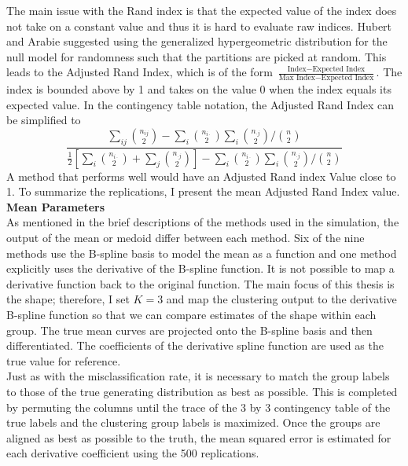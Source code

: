The main issue with the Rand index is that the expected value of the index does not take on a constant value and thus it is hard to evaluate raw indices. Hubert and Arabie suggested using the generalized hypergeometric distribution for the null model for randomness such that the partitions are picked at random. This leads to the Adjusted Rand Index, which is of the form $\frac{\text{Index} - \text{Expected Index}}{\text{Max Index}-\text{Expected Index}}$. The index is bounded above by 1 and takes on the value 0 when the index equals its expected value. In the contingency table notation, the Adjusted Rand Index can be simplified to
$$\frac{\sum_{ij}{n_{ij} \choose 2} - \sum_{i} {n_{i\cdot} \choose 2} \sum_{i} {n_{\cdot j} \choose 2} / {n \choose 2}}{\frac{1}{2}\left[\sum_{i}{n_{i\cdot} \choose 2}+\sum_{j}{n_{\cdot j} \choose 2}\right] - \sum_{i} {n_{i\cdot} \choose 2} \sum_{i} {n_{\cdot j} \choose 2} / {n \choose 2}}$$
A method that performs well would have an Adjusted Rand index Value close to 1. To summarize the replications, I present the mean Adjusted Rand Index value.\\

\textbf{Mean Parameters}\\
As mentioned in the brief descriptions of the methods used in the simulation, the output of the mean or medoid differ between each method. Six of the nine methods use the B-spline basis to model the mean as a function and one method explicitly uses the derivative of the B-spline function. It is not possible to map a derivative function back to the original function. The main focus of this thesis is the shape; therefore, I set $K=3$ and map the clustering output to the derivative B-spline function so that we can compare estimates of the shape within each group. The true mean curves are projected onto the B-spline basis and then differentiated. The coefficients of the derivative spline function are used as the true value for reference. \\

Just as with the misclassification rate, it is necessary to match the group labels to those of the true generating distribution as best as possible. This is completed by permuting the columns until the trace of the 3 by 3 contingency table of the true labels and the clustering group labels is maximized. Once the groups are aligned as best as possible to the truth, the mean squared error is estimated for each derivative coefficient using the 500 replications.\\


